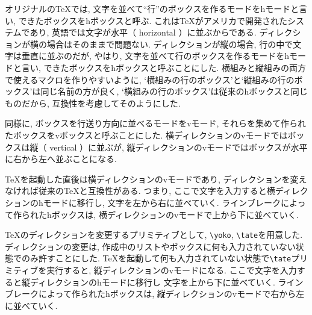 オリジナルの\TeX では, 文字を並べて``行''のボックスを作るモードをhモードと言い,
できたボックスをhボックスと呼ぶ.
これは\TeX がアメリカで開発されたシステムであり,
英語では文字が水平（\kern0pt horizontal\kern0pt ）に並ぶからである.
ディレクションが横の場合はそのままで問題ない.
ディレクションが縦の場合, 行の中で文字は垂直に並ぶのだが,
やはり, 文字を並べて行のボックスを作るモードをhモードと言い,
できたボックスをhボックスと呼ぶことにした.
横組みと縦組みの両方で使えるマクロを作りやすいように,
`横組みの行のボックス'と`縦組みの行のボックス'は同じ名前の方が良く,
`横組みの行のボックス'は従来のhボックスと同じものだから,
互換性を考慮してそのようにした.

同様に, ボックスを行送り方向に並べるモードをvモード,
それらを集めて作られたボックスをvボックスと呼ぶことにした.
横ディレクションのvモードではボックスは縦（\kern0pt vertical\kern0pt ）に並ぶが,
縦ディレクションのvモードではボックスが水平に右から左へ並ぶことになる.

\TeX を起動した直後は横ディレクションのvモードであり,
ディレクションを変えなければ従来の\TeX と互換性がある.
つまり, ここで文字を入力すると横ディレクションのhモードに移行し,
文字を左から右に並べていく.
ラインブレークによって作られたhボックスは,
横ディレクションのvモードで上から下に並べていく.

\TeX のディレクションを変更するプリミティブとして,
\verb|\yoko|, \verb|\tate|を用意した.
ディレクションの変更は,
作成中のリストやボックスに何も入力されていない状態でのみ許すことにした.
\TeX を起動して何も入力されていない状態で\verb|\tate|プリミティブを実行すると,
縦ディレクションのvモードになる.
ここで文字を入力すると縦ディレクションのhモードに移行し
文字を上から下に並べていく.
ラインブレークによって作られたhボックスは,
縦ディレクションのvモードで右から左に並べていく.


